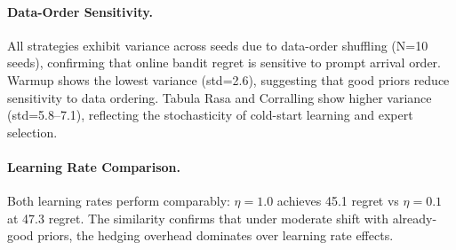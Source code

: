 \begin{table}[t]
\paragraph{Data-Order Sensitivity.}
All strategies exhibit variance across seeds due to data-order shuffling (N=10 seeds), 
confirming that online bandit regret is sensitive to prompt arrival order.
Warmup shows the lowest variance (std=2.6), suggesting that good priors reduce sensitivity to data ordering.
Tabula Rasa and Corralling show higher variance (std=5.8--7.1), reflecting the stochasticity of cold-start learning and expert selection.

\paragraph{Learning Rate Comparison.}
Both learning rates perform comparably: $\eta=1.0$ achieves 45.1 regret vs $\eta=0.1$ at 47.3 regret.
The similarity confirms that under moderate shift with already-good priors, the hedging overhead dominates over learning rate effects.

\end{table}
